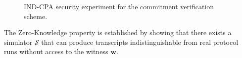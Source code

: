 \begin{figure}[htb]
\centering
{}
\caption{IND-CPA security experiment for the commitment verification scheme.}
\label{fig:cpa_game}
\end{figure}

The Zero-Knowledge property is established by showing that there exists a simulator $\mathcal{S}$ that can produce transcripts indistinguishable from real protocol runs without access to the witness $\mathbf{w}$.
